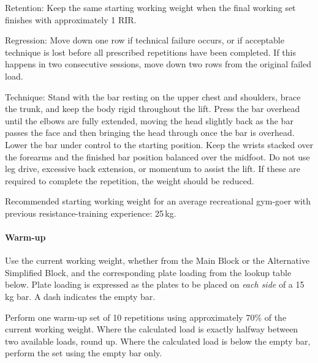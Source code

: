 \documentclass[11pt,a4paper]{article}
\begin{document}
Retention: Keep the same starting working weight when the final working set finishes with approximately 1 RIR.

Regression: Move down one row if technical failure occurs, or if acceptable technique is lost before all prescribed repetitions have been completed. If this happens in two consecutive sessions, move down two rows from the original failed load.

Technique: Stand with the bar resting on the upper chest and shoulders, brace the trunk, and keep the body rigid throughout the lift. Press the bar overhead until the elbows are fully extended, moving the head slightly back as the bar passes the face and then bringing the head through once the bar is overhead. Lower the bar under control to the starting position. Keep the wrists stacked over the forearms and the finished bar position balanced over the midfoot. Do not use leg drive, excessive back extension, or momentum to assist the lift. If these are required to complete the repetition, the weight should be reduced.

Recommended starting working weight for an average recreational gym-goer with previous resistance-training experience: 25\,kg.

\paragraph{Warm-up}

Use the current working weight, whether from the Main Block or the Alternative Simplified Block, and the corresponding plate loading from the lookup table below. Plate loading is expressed as the plates to be placed on \emph{each side} of a 15\,kg bar. A dash indicates the empty bar.

Perform one warm-up set of 10 repetitions using approximately 70\% of the current working weight. Where the calculated load is exactly halfway between two available loads, round up. Where the calculated load is below the empty bar, perform the set using the empty bar only.
\end{document}
